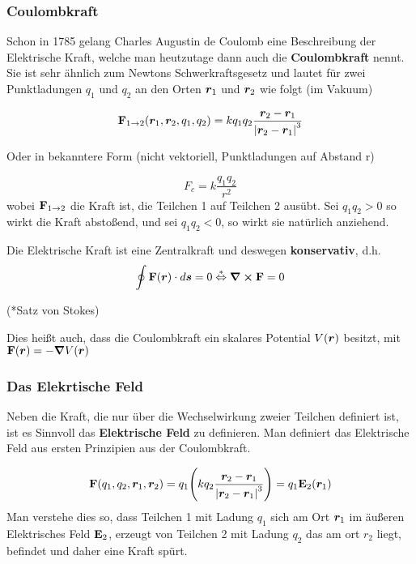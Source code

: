 \subsubsection{Coulombkraft}%
\label{ssub:Coulombkraft}
Schon in 1785 gelang Charles Augustin de Coulomb eine Beschreibung der
Elektrische Kraft, welche man heutzutage dann auch die 
\textbf{Coulombkraft} 
nennt. Sie ist sehr ähnlich zum Newtons Schwerkraftsgesetz und lautet für 
zwei Punktladungen $q_1$ und $q_2$ an den Orten $\vb*r_1$ und $\vb*r_2$ wie 
folgt (im Vakuum)

\begin{equation}
  \vb F_{1\to2}(\vb*r_1, \vb*r_2, q_1, q_2)= k q_1 q_2 \frac{\vb*r_2-\vb*r_1}{\abs{\vb*r_2-\vb*r_1}^3} 
\end{equation}

\noindent
\begin{center}
Oder in bekanntere Form (nicht vektoriell, Punktladungen auf Abstand r)
\end{center}
\begin{equation*}
  F_c = k \frac{q_1 q_2}{r^2} 
\end{equation*}
wobei $\vb F_{1\to2}$ die Kraft ist, die Teilchen 1 auf Teilchen 2 ausübt. 
Sei $q_1q_2>0$ so wirkt die Kraft abstoßend, 
und sei $q_1q_2<0$, so wirkt sie natürlich anziehend.

\noindent
Die Elektrische Kraft ist eine Zentralkraft und deswegen 
\textbf{konservativ}, d.h. 
\begin{equation}
  \oint \vb F(\vb* r) \cdot d\vb*s = 0 \stackrel{*}{\Leftrightarrow} \curl \vb F =0
\end{equation}
\begin{center}
(*Satz von Stokes)
\end{center}
Dies heißt auch, dass die Coulombkraft ein skalares Potential $V(\vb*r)$ besitzt, mit
$\vb F(\vb*r)=-\grad V(\vb*r)$

\subsubsection{Das Elekrtische Feld}%
\label{ssub:E-feld}
Neben die Kraft, die nur über die Wechselwirkung zweier Teilchen definiert
ist, ist es Sinnvoll das \textbf{Elektrische Feld} zu definieren. Man 
definiert das Elektrische Feld aus ersten Prinzipien aus der Coulombkraft.

\begin{equation*}
  \vb F(q_1, q_2, \vb*r_1, \vb*r_2) 
  = 
  q_1 
  \qty(k q_2 \frac{\vb*r_2 - \vb*r_1}{\abs{\vb*r_2 - \vb*r_1}^3})
  = q_1 \vb E_2(\vb*r_1)
\end{equation*}
Man verstehe dies so, dass Teilchen 1 mit Ladung $q_1$ 
sich am Ort $\vb*r_1$ im äußeren Elektrisches Feld $\vb E_2$, 
erzeugt von Teilchen 2 mit 
Ladung $q_2$ das am ort $r_2$ liegt, befindet und daher eine Kraft spürt.


